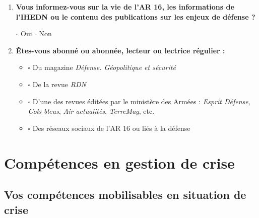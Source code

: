 \documentclass[12pt,a4paper]{article}
\newcommand{\Case}{\(\square\)}
\newcommand{\Question}[1]{\item \textbf{#1}\par\vspace{0.1em}}
\begin{document}
\begin{enumerate}[label=\textbf{\arabic*.},leftmargin=0pt,itemindent=1.9em,labelwidth=1.4em,labelsep=0.5em,resume]
\Question{Vous informez-vous sur la vie de l'AR 16, les informations de l'IHEDN ou le contenu des publications sur les enjeux de défense ?}

\Case{} Oui \hspace{1cm} \Case{} Non

\Question{Êtes-vous abonné ou abonnée, lecteur ou lectrice régulier :}

\begin{itemize}[leftmargin=1.5cm]
    \item[] \Case{} Du magazine \emph{Défense. Géopolitique et sécurité}
    \item[] \Case{} De la revue \emph{RDN}
    \item[] \Case{} D'une des revues éditées par le ministère des Armées : \emph{Esprit Défense}, \emph{Cols bleus}, \emph{Air actualités}, \emph{TerreMag}, etc.
    \item[] \Case{} Des réseaux sociaux de l'AR 16 ou liés à la défense
\end{itemize}

\end{enumerate}

\section{Compétences en gestion de crise}

\subsection{Vos compétences mobilisables en situation de crise}
\end{document}
